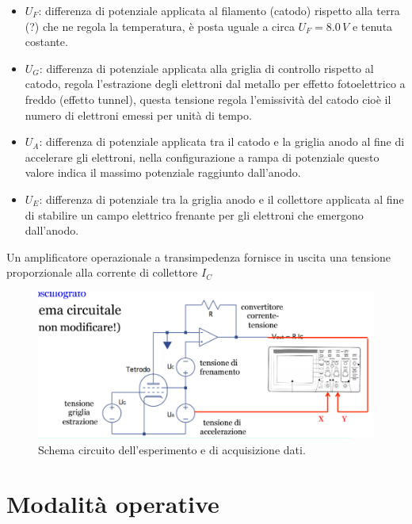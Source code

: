 \documentclass[10pt,a4paper]{article}
\begin{document}
\begin{itemize}
\item $U_F$: differenza di potenziale applicata al filamento (catodo) rispetto alla terra (?) che ne regola la temperatura, è posta uguale a circa $U_F = 8.0 \,V$ e tenuta costante.
\item $U_G$: differenza di potenziale applicata alla griglia di controllo rispetto al catodo, regola l'estrazione degli elettroni dal metallo per effetto fotoelettrico a freddo (effetto tunnel), questa tensione regola l'emissività del catodo cioè il numero di elettroni emessi per unità di tempo.
\item $U_A$: differenza di potenziale applicata tra il catodo e la griglia anodo al fine di accelerare gli elettroni, nella configurazione a rampa di potenziale questo valore indica il massimo potenziale raggiunto dall'anodo.
\item $U_E$: differenza di potenziale tra la griglia anodo e il collettore applicata al fine di stabilire un campo elettrico frenante per gli elettroni che emergono dall'anodo.
\end{itemize}

Un amplificatore operazionale a transimpedenza fornisce in uscita una tensione proporzionale alla corrente di collettore $I_C$

\begin{figure}[!htb]
  \centering
  \includegraphics[scale=.5]{circuito.png}
\caption{Schema circuito dell'esperimento e di acquisizione dati.}
\label{circuito}
\end{figure}


\section{Modalità operative}
\end{document}

